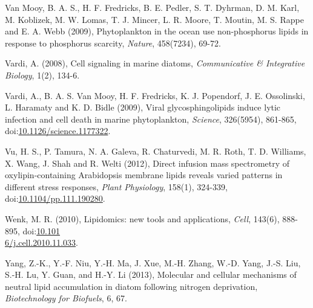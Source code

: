 \begin{singlespace}
{{Van Mooy, B. A. S., H. F. Fredricks, B. E. Pedler, S. T. Dyhrman, D. M. Karl, M. Koblizek, M. W. Lomas, T. J. Mincer, L. R. Moore, T. Moutin, M. S. Rappe and E. A. Webb (2009), Phytoplankton in the ocean use non-phosphorus lipids in response to phosphorus scarcity, \emph{Nature}, 458(7234), 69-72.

Vardi, A. (2008), Cell signaling in marine diatoms, \emph{Communicative \& Integrative Biology}, 1(2), 134-6.

Vardi, A., B. A. S. Van Mooy, H. F. Fredricks, K. J. Popendorf, J. E. Ossolinski, L. Haramaty and K. D. Bidle (2009), Viral glycosphingolipids induce lytic infection and cell death in marine phytoplankton, \emph{Science}, 326(5954), 861-865, doi:\href{http://dx.doi.org/10.1126/science.1177322}{10.1126/science.1177322}.

Vu, H. S., P. Tamura, N. A. Galeva, R. Chaturvedi, M. R. Roth, T. D. Williams, X. Wang, J. Shah and R. Welti (2012), Direct infusion mass spectrometry of oxylipin-containing Arabidopsis membrane lipids reveals varied patterns in different stress responses, \emph{Plant Physiology}, 158(1), 324-339, doi:\href{http://dx.doi.org/10.1104/pp.111.190280}{10.1104/pp.111.190280}.

Wenk, M. R. (2010), Lipidomics: new tools and applications, \emph{Cell}, 143(6), 888-895, doi:\href{http://dx.doi.org/10.1016/j.cell.2010.11.033}{10.101\\6/j.cell.2010.11.033}.

Yang, Z.-K., Y.-F. Niu, Y.-H. Ma, J. Xue, M.-H. Zhang, W.-D. Yang, J.-S. Liu, S.-H. Lu, Y. Guan, and H.-Y. Li (2013), Molecular and cellular mechanisms of neutral lipid accumulation in diatom following nitrogen deprivation, \emph{Biotechnology for Biofuels}, 6, 67.}}
\end{singlespace}

\clearpage


